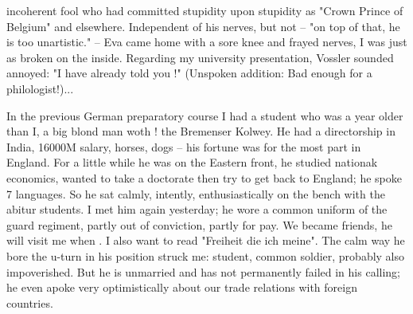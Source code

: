 incoherent fool who had committed stupidity upon stupidity as "Crown Prince of Belgium" and elsewhere. Independent of his nerves, but not  -- "on top of that, he is too unartistic." -- 
Eva came home with a sore knee and frayed nerves, I was just as broken on the inside. Regarding my university presentation, Vossler sounded annoyed: "I have already told you !" (Unspoken addition: Bad enough for a philologist!)...\missing

In the previous German preparatory course I had a student who was a year older than I, a big blond man woth ! the Bremenser Kolwey. He had a directorship in India, 16000M salary, horses, dogs -- his fortune was for the most part in England. For a little while he was on the Eastern front, he studied nationak economics, wanted to take a doctorate then try to get back to England; he spoke 7 languages. So he sat calmly, intently, enthusiastically on the bench with the abitur students. I met him again yesterday; he wore a common uniform of the guard regiment, partly out of conviction, partly for pay. We became friends, he will visit me when . I also want to read  "Freiheit die ich meine". The calm way he bore the u-turn in his position struck me: student, common soldier, probably also impoverished. But he is unmarried and has not permanently failed in his calling; he even apoke very optimistically about our trade relations with foreign countries.

\missing

